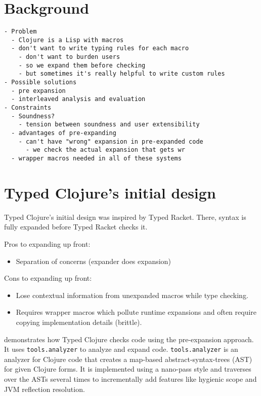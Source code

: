 \chapter{Background}

{
\singlespacing
\begin{verbatim}
- Problem
  - Clojure is a Lisp with macros
  - don't want to write typing rules for each macro
    - don't want to burden users
    - so we expand them before checking
    - but sometimes it's really helpful to write custom rules
- Possible solutions
  - pre expansion
  - interleaved analysis and evaluation
- Constraints
  - Soundness?
    - tension between soundness and user extensibility
  - advantages of pre-expanding
    - can't have "wrong" expansion in pre-expanded code
      - we check the actual expansion that gets wr
  - wrapper macros needed in all of these systems
\end{verbatim}
}

\chapter{Typed Clojure's initial design}

Typed Clojure's initial design was inspired by Typed Racket.
There, syntax is fully expanded before Typed Racket checks it.

Pros to expanding up front:

\begin{itemize}
  \item Separation of concerns (expander does expansion)
\end{itemize}

Cons to expanding up front:

\begin{itemize}
  \item Lose contextual information from unexpanded macros while type checking.
  \item Requires wrapper macros which pollute runtime expansions and
        often require copying implementation details (brittle).
\end{itemize}

 demonstrates 
how Typed Clojure checks code using the pre-expansion approach.
It uses \texttt{tools.analyzer} to analyze and expand code.
\texttt{tools.analyzer} is an analyzer for Clojure code that creates
a map-based abstract-syntax-trees (AST) for given Clojure forms.
It is implemented using a nano-pass style and traverses over the ASTs
several times to incrementally add features like hygienic scope
and JVM reflection resolution.

